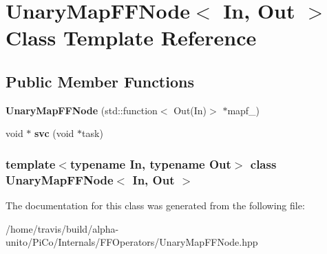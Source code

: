 \hypertarget{class_unary_map_f_f_node}{\section{\-Unary\-Map\-F\-F\-Node$<$ \-In, \-Out $>$ \-Class \-Template \-Reference}
\label{class_unary_map_f_f_node}
}
\subsection*{\-Public \-Member \-Functions}
\begin{DoxyCompactItemize}
\item 
\hypertarget{class_unary_map_f_f_node_a22d4bcccfd9e6772891cb264e6c87780}{{\bfseries \-Unary\-Map\-F\-F\-Node} (std\-::function$<$ \-Out(\-In)$>$ $\ast$mapf\-\_\-)}\label{class_unary_map_f_f_node_a22d4bcccfd9e6772891cb264e6c87780}

\item 
\hypertarget{class_unary_map_f_f_node_a5c994712fefbef1df5bc44502a8febd8}{void $\ast$ {\bfseries svc} (void $\ast$task)}\label{class_unary_map_f_f_node_a5c994712fefbef1df5bc44502a8febd8}

\end{DoxyCompactItemize}
\subsubsection*{template$<$typename In, typename Out$>$ class Unary\-Map\-F\-F\-Node$<$ In, Out $>$}



\-The documentation for this class was generated from the following file\-:\begin{DoxyCompactItemize}
\item 
/home/travis/build/alpha-\/unito/\-Pi\-Co/\-Internals/\-F\-F\-Operators/\-Unary\-Map\-F\-F\-Node.\-hpp\end{DoxyCompactItemize}
